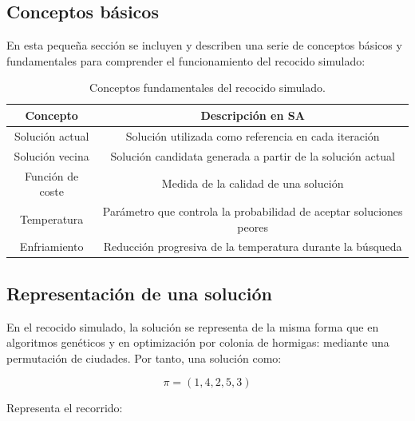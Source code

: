 \subsection{Conceptos básicos}
\label{subsec:sa_concepts}

En esta pequeña sección se incluyen y describen una serie de conceptos básicos y fundamentales para comprender el funcionamiento 
del recocido simulado:

\begin{table}[ht]
    \renewcommand{\arraystretch}{1.3}
    \caption{Conceptos fundamentales del recocido simulado.}
    \label{tab:sa_concepts}
    \begin{center}
        \begin{tabular}{|c|c|}
            \hline
            \textbf{Concepto} & \textbf{Descripción en SA} \\
            \hline
            Solución actual & Solución utilizada como referencia en cada iteración \\
            \hline
            Solución vecina & Solución candidata generada a partir de la solución actual \\
            \hline
            Función de coste & Medida de la calidad de una solución \\
            \hline
            Temperatura & Parámetro que controla la probabilidad de aceptar soluciones peores \\
            \hline
            Enfriamiento & Reducción progresiva de la temperatura durante la búsqueda \\
            \hline
        \end{tabular}
    \end{center}
\end{table}

\subsection{Representación de una solución}
\label{subsec:sa_rep}

En el recocido simulado, la solución se representa de la misma forma que en algoritmos genéticos y en optimización por 
colonia de hormigas: mediante una permutación de ciudades. Por tanto, una solución como:

\begin{equation}
  \pi = (1, 4, 2, 5, 3)
\end{equation}

Representa el recorrido:

